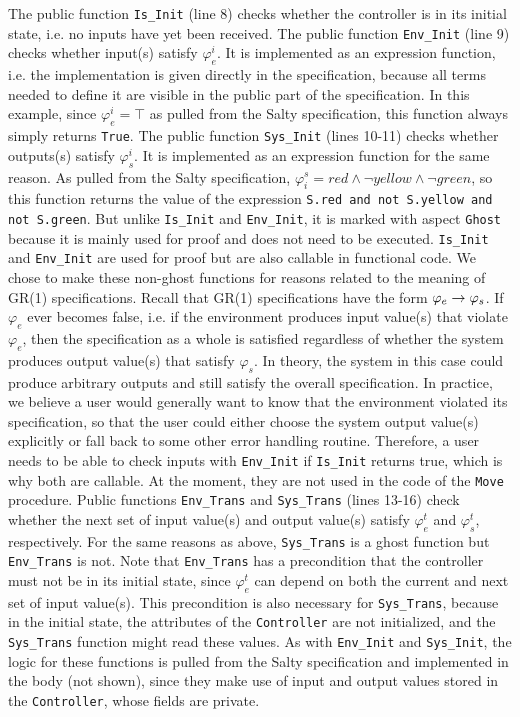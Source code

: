 \documentclass[runningheads]{llncs}
\begin{document}
The public function \lstinline{Is_Init} (line 8) checks whether the controller is in its initial state, i.e. no inputs have yet been received. 
The public function \lstinline{Env_Init} (line 9) checks whether input(s) satisfy $\varphi_e^i$. 
It is implemented as an expression function, i.e. the implementation is given directly in the specification, 
because all terms needed to define it are visible in the public part of the specification. 
In this example, since $\varphi_e^i = \top$ as pulled from the Salty specification, this function always simply returns \lstinline{True}. 
The public function \lstinline{Sys_Init} (lines 10-11) checks whether outputs(s) satisfy $\varphi_s^i$. 
It is implemented as an expression function for the same reason.  
As pulled from the Salty specification, $\varphi^s_i = red \land \lnot yellow \land \lnot green$, so this function returns the value of
the expression \lstinline{S.red and not S.yellow and not S.green}.
But unlike \lstinline{Is_Init} and \lstinline{Env_Init}, it is marked with aspect \lstinline{Ghost} because it is mainly used for proof and does not need to be executed. 
\lstinline{Is_Init} and \lstinline{Env_Init} are used for proof but are also callable in functional code. 
We chose to make these non-ghost functions for reasons related to the meaning of GR(1) specifications. 
Recall that GR(1) specifications have the form $\varphi_e \rightarrow \varphi_s$. 
If $\varphi_e$ ever becomes false, i.e. if the environment produces input value(s) that violate $\varphi_e$, then the specification as a whole 
is satisfied regardless of whether the system produces output value(s) that satisfy $\varphi_s$. 
In theory, the system in this case could produce arbitrary outputs and still satisfy the overall specification. 
In practice, we believe a user would generally want to know that the environment violated its specification, 
so that the user could either choose the system output value(s) explicitly or fall back to some other error handling routine. 
Therefore, a user needs to be able to check inputs with \lstinline{Env_Init} if \lstinline{Is_Init} returns true, 
which is why both are callable. At the moment, they are not used in the code of the \lstinline{Move} procedure.
Public functions \lstinline{Env_Trans} and \lstinline{Sys_Trans} (lines 13-16) check whether the next set of input value(s) and output value(s) 
satisfy $\varphi_e^t$ and $\varphi_s^t$, respectively. 
For the same reasons as above, \lstinline{Sys_Trans} is a ghost function but \lstinline{Env_Trans} is not.
Note that \lstinline{Env_Trans} has a precondition that the controller must not be in its initial state, 
since $\varphi_e^t$ can depend on both the current and next set of input value(s). 
This precondition is also necessary for \lstinline{Sys_Trans}, because in the initial state, the attributes of the \lstinline{Controller} are not initialized, and the \lstinline{Sys_Trans} function might read these values. 
As with \lstinline{Env_Init} and \lstinline{Sys_Init}, the logic for these functions is pulled from the Salty specification and 
implemented in the body (not shown), since they make use of input and output values stored in the \lstinline{Controller}, whose fields are private.
\end{document}
